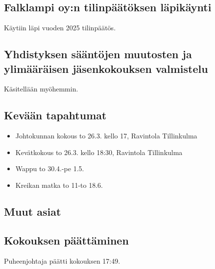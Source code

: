 \documentclass[a4paper,12pt]{article}
\begin{document}
\subsection{Falklampi oy:n tilinpäätöksen läpikäynti}
Käytiin läpi vuoden 2025 tilinpäätös.
\subsection{Yhdistyksen sääntöjen muutosten ja ylimääräisen jäsenkokouksen valmistelu}
Käsitellään myöhemmin.
\subsection{Kevään tapahtumat}
\begin{itemize}
\item{Johtokunnan kokous} to 26.3. kello 17, Ravintola Tillinkulma
\item{Kevätkokous} to 26.3. kello 18:30, Ravintola Tillinkulma
\item{Wappu} to 30.4.-pe 1.5.
\item{Kreikan matka} to 11-to 18.6.
\end{itemize}
\subsection{Muut asiat}
\subsection{Kokouksen päättäminen}
Puheenjohtaja päätti kokouksen 17:49.
\end{document}
